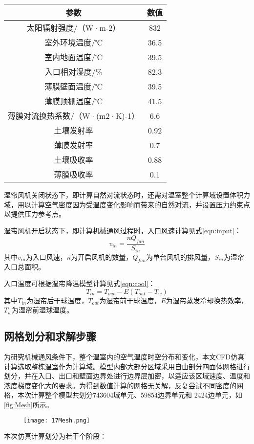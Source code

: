 		\begin{table}[!hpb]
  			\centering
  			\begin{tabular}{cc} \toprule
			参数 & 数值\\ \midrule
			太阳辐射强度/（W·m-2） & 	832\\
			室外环境温度/℃	 & 36.5\\
			室内地面温度/℃ & 	39.5\\
			入口相对湿度/\%	 & 82.3\\
			薄膜壁面温度/℃	 & 39.5\\
			薄膜顶棚温度/℃	 & 41.5\\
			薄膜对流换热系数/（W·(m2·K)-1） & 6.6\\
			土壤发射率 & 0.92\\
			薄膜发射率 & 0.7\\
			土壤吸收率 & 0.88\\
			薄膜吸收率 & 0.1\\ \bottomrule
 			\end{tabular}
		\end{table}
湿帘风机关闭状态下，即计算自然对流状态时，还需对温室整个计算域设置体积力域，用以计算空气密度因为受温度变化影响而带来的自然对流，并设置压力约束点以提供压力参考点。

湿帘风机开启状态下，即计算机械通风过程时，入口风速计算\supercite{RenShougang2015}见式\ref{eqn:input}：
	\begin{equation}
		\label{eqn:input}
		v_{in} = \frac{n Q_{fan}}{S_{in}}
	\end{equation}
其中$v_{in}$为入口风速，$n$为开启风机的数量，$Q_{fan}$为单台风机的排风量，$S_{in}$为湿帘入口总面积。

入口温度可根据湿帘降温模型计算\supercite{JBT}见式\ref{eqn:cool}：
	\begin{equation}
		\label{eqn:cool}
		T_{in}=T_{out}-E (T_{out} - T_{w})
	\end{equation}
其中$T_{in}$为湿帘后干球温度，$T_{out}$为湿帘前干球温度，$E$为湿帘蒸发冷却换热效率，$T_w$为湿帘前湿球温度。

	\subsection{网格划分和求解步骤}
为研究机械通风条件下，整个温室内的空气温度时空分布和变化，本文CFD仿真计算选取整栋温室作为计算域。模型内部大部分区域采用自由剖分四面体网格进行划分，并在入口、出口和壁面边界处进行边界层加密，以适应该区域速度、温度和浓度梯度变化大的要求。为得到数值计算的网格无关解，反复尝试不同密度的网格，本次计算整个模型共划分743604域单元、59854边界单元和 2424边单元，如\ref{fig:Mesh}所示。
	\begin{figure}[!htp]
		\centering
		\texttt{[image: 17Mesh.png]}
	\end{figure}
本次仿真计算划分为若干个阶段：

